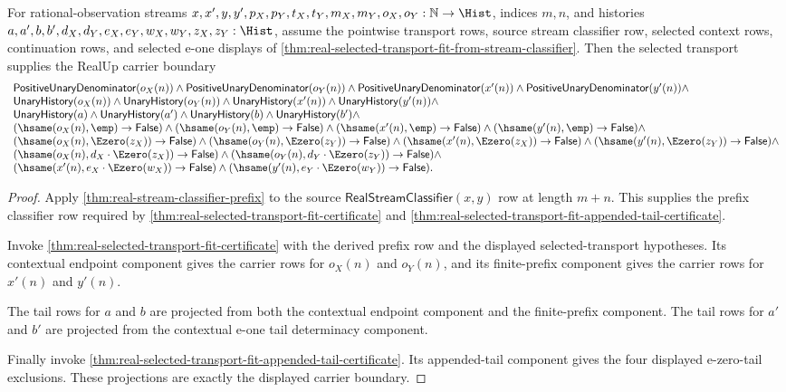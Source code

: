 \begin{theorem}
\label{thm:real-selected-transport-fit-carrier-obligation}
For rational-observation streams
$x,x',y,y',p_X,p_Y,t_X,t_Y,m_X,m_Y,o_X,o_Y:\mathbb{N}\to\Hist$,
indices $m,n$, and histories
$a,a',b,b',d_X,d_Y,e_X,e_Y,w_X,w_Y,z_X,z_Y:\Hist$, assume the pointwise
transport rows, source stream classifier row, selected context rows,
continuation rows, and selected e-one displays of
\autoref{thm:real-selected-transport-fit-from-stream-classifier}. Then the
selected transport supplies the RealUp carrier boundary
$$
\begin{array}{l}
\mathsf{PositiveUnaryDenominator}(o_X(n))\land
\mathsf{PositiveUnaryDenominator}(o_Y(n))\land
\mathsf{PositiveUnaryDenominator}(x'(n))\land
\mathsf{PositiveUnaryDenominator}(y'(n))\land\\
\mathsf{UnaryHistory}(o_X(n))\land
\mathsf{UnaryHistory}(o_Y(n))\land
\mathsf{UnaryHistory}(x'(n))\land
\mathsf{UnaryHistory}(y'(n))\land\\
\mathsf{UnaryHistory}(a)\land
\mathsf{UnaryHistory}(a')\land
\mathsf{UnaryHistory}(b)\land
\mathsf{UnaryHistory}(b')\land\\
(\hsame(o_X(n),\emp)\to\mathsf{False})\land
(\hsame(o_Y(n),\emp)\to\mathsf{False})\land
(\hsame(x'(n),\emp)\to\mathsf{False})\land
(\hsame(y'(n),\emp)\to\mathsf{False})\land\\
(\hsame(o_X(n),\Ezero(z_X))\to\mathsf{False})\land
(\hsame(o_Y(n),\Ezero(z_Y))\to\mathsf{False})\land
(\hsame(x'(n),\Ezero(z_X))\to\mathsf{False})\land
(\hsame(y'(n),\Ezero(z_Y))\to\mathsf{False})\land\\
(\hsame(o_X(n),d_X\cdot\Ezero(z_X))\to\mathsf{False})\land
(\hsame(o_Y(n),d_Y\cdot\Ezero(z_Y))\to\mathsf{False})\land\\
(\hsame(x'(n),e_X\cdot\Ezero(w_X))\to\mathsf{False})\land
(\hsame(y'(n),e_Y\cdot\Ezero(w_Y))\to\mathsf{False}).
\end{array}
$$
\end{theorem}
\begin{proof}
Apply \autoref{thm:real-stream-classifier-prefix} to the source
$\mathsf{RealStreamClassifier}(x,y)$ row at length $m+n$. This supplies the
prefix classifier row required by
\autoref{thm:real-selected-transport-fit-certificate} and
\autoref{thm:real-selected-transport-fit-appended-tail-certificate}.

Invoke \autoref{thm:real-selected-transport-fit-certificate} with the derived
prefix row and the displayed selected-transport hypotheses. Its contextual
endpoint component gives the carrier rows for $o_X(n)$ and $o_Y(n)$, and its
finite-prefix component gives the carrier rows for $x'(n)$ and $y'(n)$.

The tail rows for $a$ and $b$ are projected from both the contextual endpoint
component and the finite-prefix component. The tail rows for $a'$ and $b'$ are
projected from the contextual e-one tail determinacy component.

Finally invoke
\autoref{thm:real-selected-transport-fit-appended-tail-certificate}. Its
appended-tail component gives the four displayed e-zero-tail exclusions. These
projections are exactly the displayed carrier boundary.
\end{proof}
